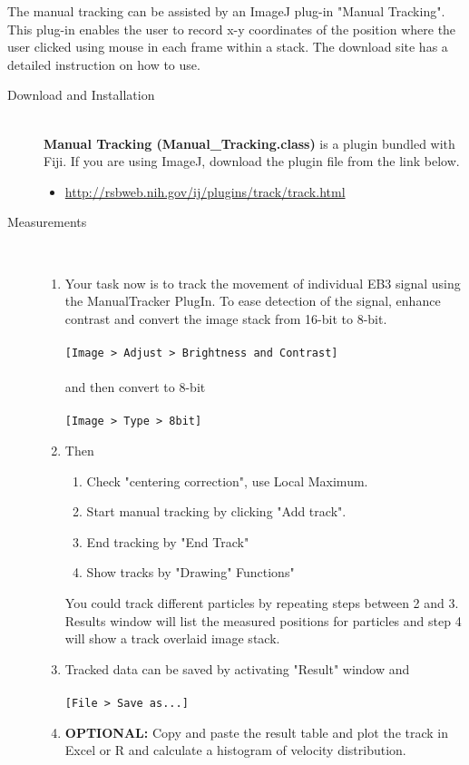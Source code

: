 \documentclass[11pnt]{article}
\begin{document}
The manual tracking can be assisted by an ImageJ plug-in
"Manual Tracking". This plug-in
enables the user to record x-y coordinates of the position where the
user clicked using mouse in each frame within a stack. The download
site has a detailed instruction on how to use.  

\begin{description}
\item[Download and Installation]\hfill\\

\textbf{Manual Tracking (Manual\_Tracking.class)} is a plugin bundled with Fiji. If you are using ImageJ, download the plugin file from the link below. 
\begin{itemize}
\item \url{http://rsbweb.nih.gov/ij/plugins/track/track.html}
\end{itemize}

\item[Measurements]\hfill\\

\begin{enumerate}
\item Your task now is to track the movement of individual EB3 signal using the ManualTracker PlugIn. To ease detection of the signal, enhance contrast and convert the image stack from 16-bit to 8-bit.
\\
\\
\verb"[Image > Adjust > Brightness and Contrast]"
\\
\\
and then convert to 8-bit
\\
\\
\verb"[Image > Type > 8bit]"
\\
\item Then 
\begin{enumerate}
\item Check "centering correction", use Local Maximum.
\item Start manual tracking by clicking "Add track".
\item End tracking by "End Track"
\item Show tracks by "Drawing" Functions"
\end{enumerate}

You could track different particles by repeating steps between 2 and 3. Results window will list the measured positions for particles and step 4 will show a track overlaid image stack.

\item Tracked data can be saved by activating "Result" window and 
\\
\\
\verb"[File > Save as...]"
\\
\item \textbf{OPTIONAL:} Copy and paste the result table and plot the track in Excel or R and calculate a histogram of velocity distribution.
\end{enumerate}

\end{description}
\end{document}
